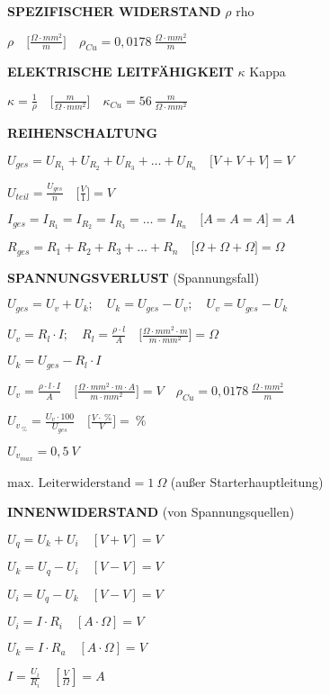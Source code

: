 \textbf{SPEZIFISCHER WIDERSTAND} $\rho$ rho

$\rho \quad \bigl[\frac{\Omega \cdot mm^2}{m}\bigl] \quad \rho_{Cu} = 0,0178~\frac{\Omega \cdot mm^2}{m}$

\textbf{ELEKTRISCHE LEITFÄHIGKEIT} $\kappa$ Kappa

$\boxed{\kappa = \frac{1}{\rho}} \quad \bigl[\frac{m}{\Omega \cdot mm^2}\bigl] \quad \kappa_{Cu} = 56~\frac{m}{\Omega \cdot mm^2}$

\textbf{REIHENSCHALTUNG}

$\boxed{U_{ges} = U_{R_1} + U_{R_2} + U_{R_3} + \dots + U_{R_n}} \quad \bigl[V + V + V\bigl] = V$

$\boxed{U_{teil} = \frac{U_{ges}}{n}} \quad \bigl[\frac{V}{1}\bigl] = V$

$\boxed{I_{ges} = I_{R_1} = I_{R_2} = I_{R_3} = \dots = I_{R_n}} \quad \bigl[A = A = A\bigl] = A$

$\boxed{R_{ges} = R_1 + R_2 + R_3 + \dots + R_n} \quad \bigl[\Omega + \Omega + \Omega\bigl] = \Omega$

\textbf{SPANNUNGSVERLUST} (Spannungsfall)

$U_{ges} = U_v + U_k;\quad U_k = U_{ges} - U_v;\quad U_v = U_{ges} - U_k$

$U_v = R_l \cdot I;\quad R_l = \frac{\rho \cdot l}{A} \quad \bigl[\frac{\Omega \cdot mm^2 \cdot m}{m \cdot mm^2}\bigl] = \Omega$

$U_k = U_{ges} - R_l \cdot I$

$\boxed{U_v = \frac{\rho \cdot l \cdot I}{A}} \quad \bigl[\frac{\Omega \cdot mm^2 \cdot m \cdot A}{m \cdot mm^2}\bigl] = V \quad \rho_{Cu} = 0,0178~\frac{\Omega \cdot mm^2}{m}$

$U_{v_{~\%}} = \frac{U_v \cdot 100}{U_{ges}} \quad \bigl[\frac{V \cdot ~\%}{V}\bigl] = ~\%$

$\boxed{U_{v_{max}} = 0,5~V}$

$\boxed{\text{max. Leiterwiderstand} = 1~\Omega}$ (außer
Starterhauptleitung)

\textbf{INNENWIDERSTAND} (von Spannungsquellen)

$U_q = U_k + U_i \quad [V + V] = V$

$U_k = U_q - U_i \quad [V - V] = V$

$U_i = U_q - U_k \quad [V - V] = V$

$U_i = I \cdot R_i \quad [A \cdot \Omega] = V$

$U_k = I \cdot R_a \quad [A \cdot \Omega] = V$

$I = \frac{U_i}{R_i} \quad [\frac{V}{\Omega}] = A$

